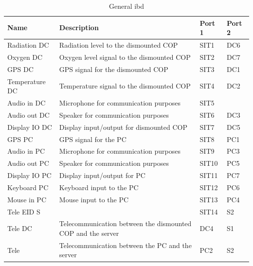 \begin{table}[H]  
\centering

\begin{tabular}{|l|p{8cm}|l|l|} 
\hline
	\textbf{Name}		& \textbf{Description}						  & \textbf{Port 1} & \textbf{Port 2} \\\hline
  Radiation DC				&  Radiation level to the dismounted COP 	 					   & SIT1 & DC6 \\\hline
  Oxygen DC					&  Oxygen level signal to the dismounted COP				   & SIT2 & DC7 \\\hline
  GPS DC					&  GPS signal for the dismounted COP 	 					   & SIT3 & DC1 \\\hline   
  Temperature DC			&  Temperature signal to the dismounted COP 	 					   & SIT4 & DC2 \\\hline     
  Audio in DC				&  Microphone for communication purposes 	 				   & SIT5 &\fxfatal{DC8  FIX PÅ DIAGRAM!!!!!}\\\hline     
  Audio out DC				&  Speaker for communication purposes 	 					   & SIT6 & DC3 \\\hline     
  Display IO DC				&  Display input/output for dismounted COP 	 					   & SIT7 & DC5 \\\hline     
  
  GPS PC					&  GPS signal for the PC			 	 					   & SIT8 & PC1 \\\hline     
  Audio in PC				&  Microphone for communication purposes 	 					   & SIT9 & PC3 \\\hline     
  Audio out PC				&  Speaker for communication purposes 	 					   & SIT10 & PC5 \\\hline     
  Display IO PC				&  Display input/output for PC 	 					   & SIT11 & PC7 \\\hline     
  Keyboard PC				&  Keyboard input to the PC 	 					   & SIT12 & PC6 \\\hline     
  Mouse in PC				&  Mouse input to the PC 	 					   & SIT13 & PC4 \\\hline    
  Tele EID S				&  \fxfatal{MANGLER !!!} 					   & SIT14 & S2 \\\hline
       
  Tele DC					&  Telecommunication between the dismounted COP and the server & DC4 & S1 \\\hline   
  Tele 						&  Telecommunication between the PC and the server 					   & PC2 & S2 \\\hline   
   
\end{tabular}
\caption {General ibd} 
\end{table} 




